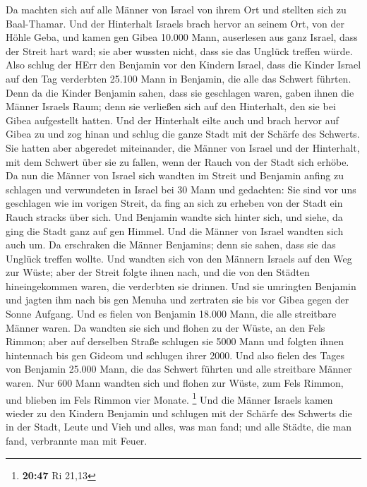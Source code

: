  Da machten sich auf alle Männer von Israel von ihrem Ort
und stellten sich zu Baal-Thamar. Und der Hinterhalt Israels brach
hervor an seinem Ort, von der Höhle Geba,  und kamen gen
Gibea 10.000 Mann, auserlesen aus ganz Israel, dass der Streit hart
ward; sie aber wussten nicht, dass sie das Unglück treffen würde.
 Also schlug der HErr den Benjamin vor den Kindern
Israel, dass die Kinder Israel auf den Tag verderbten 25.100 Mann in
Benjamin, die alle das Schwert führten.  Denn da die
Kinder Benjamin sahen, dass sie geschlagen waren, gaben ihnen die Männer
Israels Raum; denn sie verließen sich auf den Hinterhalt, den sie bei
Gibea aufgestellt hatten.  Und der Hinterhalt eilte auch
und brach hervor auf Gibea zu und zog hinan und schlug die ganze Stadt
mit der Schärfe des Schwerts.  Sie hatten aber abgeredet
miteinander, die Männer von Israel und der Hinterhalt, mit dem Schwert
über sie zu fallen, wenn der Rauch von der Stadt sich erhöbe.
 Da nun die Männer von Israel sich wandten im Streit und
Benjamin anfing zu schlagen und verwundeten in Israel bei 30 Mann und
gedachten: Sie sind vor uns geschlagen wie im vorigen Streit,
 da fing an sich zu erheben von der Stadt ein Rauch
stracks über sich. Und Benjamin wandte sich hinter sich, und siehe, da
ging die Stadt ganz auf gen Himmel.  Und die Männer von
Israel wandten sich auch um. Da erschraken die Männer Benjamins; denn
sie sahen, dass sie das Unglück treffen wollte.  Und
wandten sich von den Männern Israels auf den Weg zur Wüste; aber der
Streit folgte ihnen nach, und die von den Städten hineingekommen waren,
die verderbten sie drinnen.  Und sie umringten Benjamin
und jagten ihm nach bis gen Menuha und zertraten sie bis vor Gibea gegen
der Sonne Aufgang.  Und es fielen von Benjamin 18.000
Mann, die alle streitbare Männer waren.  Da wandten sie
sich und flohen zu der Wüste, an den Fels Rimmon; aber auf derselben
Straße schlugen sie 5000 Mann und folgten ihnen hintennach bis gen
Gideom und schlugen ihrer 2000.  Und also fielen des
Tages von Benjamin 25.000 Mann, die das Schwert führten und alle
streitbare Männer waren.  Nur 600 Mann wandten sich und
flohen zur Wüste, zum Fels Rimmon, und blieben im Fels Rimmon vier
Monate. \footnote{\textbf{20:47} Ri 21,13}  Und die
Männer Israels kamen wieder zu den Kindern Benjamin und schlugen mit der
Schärfe des Schwerts die in der Stadt, Leute und Vieh und alles, was man
fand; und alle Städte, die man fand, verbrannte man mit Feuer.

